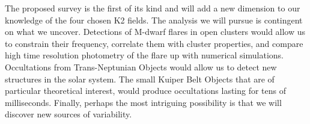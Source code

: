 \documentclass[11pt]{article}
\begin{document}
The proposed survey is the first of its kind and will add a new dimension to our knowledge of the four chosen K2 fields. The analysis we will pursue is contingent on what we uncover. Detections of M-dwarf flares in open clusters would allow us to constrain their frequency, correlate them with cluster properties, and compare high time resolution photometry of the flare up with numerical simulations. Occultations from Trans-Neptunian Objects would allow us to detect new structures in the solar system. The small Kuiper Belt Objects that are of particular theoretical interest, would produce occultations lasting for tens of milliseconds. Finally, perhaps the most intriguing possibility is that we will discover new sources of variability.








\end{document}
